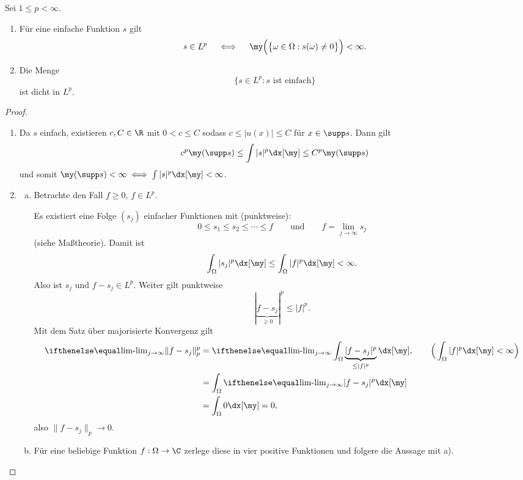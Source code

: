 \begin{st} \label{2.15}
	Sei $1 \le p < \infty$.
	\begin{enumerate}[1)]
		\item
			Für eine einfache Funktion $s$ gilt
			\[
				s \in L^p
				\quad \iff \quad
				\my\Big( \big\{ \omega \in \Omega : s(\omega) \neq 0 \big\} \Big) < \infty.
			\]
		\item
			Die Menge
			\[
				\Big\{ s \in L^p : s \text{ ist einfach} \Big\}
			\]
			ist dicht in $L^p$.
	\end{enumerate}
	\begin{proof}
		\begin{enumerate}[1)]
			\item
				Da $s$ einfach, existieren $c, C \in \R$ mit $0 < c \le C$ sodass $c \le |u(x)| \le C$ für $x \in \supp s$.
				Dann gilt
				\[
					c^p \my(\supp s) \le \int |s|^p \dx[\my] \le C^p \my(\supp s)
				\]
				und somit $\my(\supp s) < \infty \iff \int |s|^p \dx[\my] < \infty$.
			\item
				\begin{enumerate}[a)]
					\item
						Betrachte den Fall $f \ge 0$, $f \in L^p$.

						Es existiert eine Folge $(s_j)$ einfacher Funktionen mit (punktweise):
						\[
							0 \le s_1 \le s_2 \le \dotsb \le f
							\qquad \text{und} \qquad
							f = \lim_{j\to \infty} s_j
						\]
						(siehe Maßtheorie).
						Damit ist
						\[
							\int_{\Omega} |s_j|^p \dx[\my]
							\le \int_{\Omega} |f|^p \dx[\my]
							< \infty.
						\]
						Also ist $s_j$ und $f-s_j \in L^p$.
						Weiter gilt punktweise
						\[
							|\underbrace{f - s_j}_{\ge 0}|^p \le |f|^p.
						\]
						Mit dem Satz über majorisierte Konvergenz gilt
						\begin{align*}
							\lim_{j\to \infty} \|f - s_j\|_p^p
							&= \lim_{j\to \infty} \int_{\Omega} \underbrace{|f-s_j|^p}_{\le |f|^p} \dx[\my],  \qquad \Big(\int_{\Omega} |f|^p \dx[\my] < \infty\Big)\\
							&= \int_{\Omega} \lim_{j\to \infty} |f- s_j |^p \dx[\my] \\
							&= \int_{\Omega} 0 \dx[\my]
							= 0,
						\end{align*}
						also $\|f-s_j\|_p \to 0$.
					\item
						Für eine beliebige Funktion $f: \Omega \to \C$ zerlege diese in vier positive Funktionen und folgere die Aussage mit a).
				\end{enumerate}
		\end{enumerate}
	\end{proof}
\end{st}


